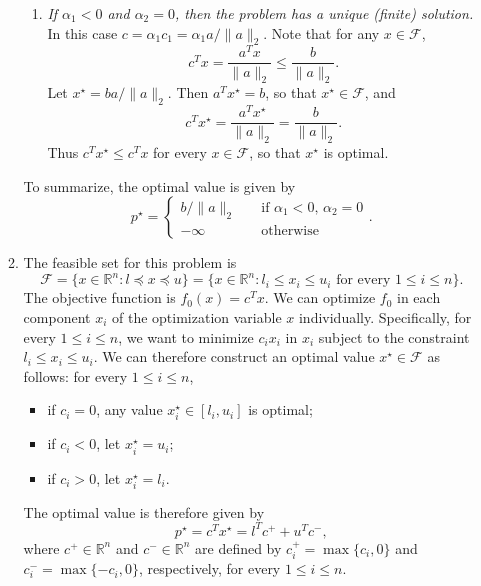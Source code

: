 \documentclass[letterpaper,12pt]{article}
\begin{document}
\begin{enumerate}
\begin{enumerate}
\begin{enumerate}
  \item \textit{If $\alpha_1 < 0$ and $\alpha_2 = 0$, then the problem
      has a unique (finite) solution.} In this case
    $c = \alpha_1 c_1 = \alpha_1 a / \lVert a \rVert_2$. Note that for
    any $x \in \mathcal{F}$,
    \begin{equation*}
      c^T x = \frac{a^T x}{\lVert a \rVert_2} \leq \frac{b}{\lVert a \rVert_2}.
    \end{equation*}
    Let $x^\star = ba / \lVert a \rVert_2$. Then $a^T x^\star = b$, so
    that $x^\star \in \mathcal{F}$, and
    \begin{equation*}
      c^T x^\star = \frac{a^T x^\star}{\lVert a \rVert_2}
        = \frac{b}{\lVert a \rVert_2}.
    \end{equation*}
    Thus $c^T x^\star \leq c^T x$ for every $x \in \mathcal{F}$, so
    that $x^\star$ is optimal.
  \end{enumerate}
  To summarize, the optimal value is given by
  \begin{equation*}
    p^\star = \begin{cases}
      b / \lVert a \rVert_2 &\quad \text{if $\alpha_1 < 0$, $\alpha_2 = 0$} \\
      -\infty &\quad \text{otherwise}
    \end{cases}.
  \end{equation*}

\item The feasible set for this problem is
  \begin{equation*}
    \mathcal{F} = \{x \in \mathbb{R}^n : l \preceq x \preceq u\}
      = \{x \in \mathbb{R}^n :
          \text{$l_i \leq x_i \leq u_i$ for every $1 \leq i \leq n$}\}.
  \end{equation*}
  The objective function is $f_0(x) = c^T x$. We can optimize $f_0$ in
  each component $x_i$ of the optimization variable $x$
  individually. Specifically, for every $1 \leq i \leq n$, we want to
  minimize $c_i x_i$ in $x_i$ subject to the constraint
  $l_i \leq x_i \leq u_i$. We can therefore construct an optimal value
  $x^\star \in \mathcal{F}$ as follows: for every $1 \leq i \leq n$,
  \begin{itemize}
  \item if $c_i = 0$, any value $x^\star_i \in [l_i, u_i]$ is optimal;
  \item if $c_i < 0$, let $x^\star_i = u_i$;
  \item if $c_i > 0$, let $x^\star_i = l_i$.
  \end{itemize}
  The optimal value is therefore given by
  \begin{equation*}
    p^\star = c^T x^\star = l^T c^+ + u^T c^-,
  \end{equation*}
  where $c^+ \in \mathbb{R}^n$ and $c^- \in \mathbb{R}^n$ are defined
  by $c^+_i = \max\{c_i, 0\}$ and $c^-_i = \max\{-c_i, 0\}$,
  respectively, for every $1 \leq i \leq n$.


\end{enumerate}
\end{enumerate}
\end{document}
